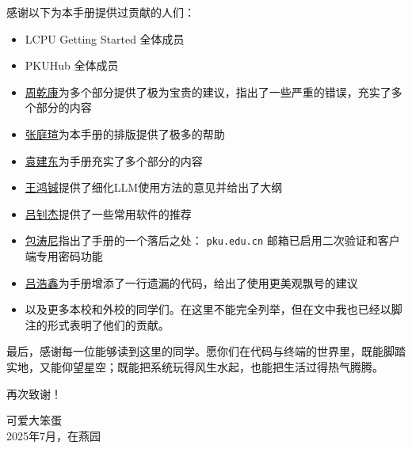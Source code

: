 感谢以下为本手册提供过贡献的人们：
\begin{itemize}
  \item LCPU Getting Started 全体成员
  \item PKUHub 全体成员
  \item \faGithub\href{https://github.com/wszqkzqk}{周乾康}为多个部分提供了极为宝贵的建议，指出了一些严重的错误，充实了多个部分的内容
  \item \faGithub\href{https://github.com/AlphaZTX}{张庭瑄}为本手册的排版提供了极多的帮助
  \item \faGithub\href{https://github.com/yjdyamv}{袁建东}为手册充实了多个部分的内容
  \item \faGithub\href{https://github.com/whcpumpkin}{王鸿铖}提供了细化LLM使用方法的意见并给出了大纲
  \item \faGithub\href{https://github.com/Elkeid-me}{吕钊杰}提供了一些常用软件的推荐
  \item \faGithub\href{https://github.com/AsTonyshment}{包涛尼}指出了手册的一个落后之处： \texttt{pku.edu.cn} 邮箱已启用二次验证和客户端专用密码功能
  \item \faGithub\href{https://github.com/ha0xin}{吕浩鑫}为手册增添了一行遗漏的代码，给出了使用更美观飘号的建议
  \item 以及更多本校和外校的同学们。在这里不能完全列举，但在文中我也已经以脚注的形式表明了他们的贡献。
\end{itemize}


最后，感谢每一位能够读到这里的同学。愿你们在代码与终端的世界里，既能脚踏实地，又能仰望星空；既能把系统玩得风生水起，也能把生活过得热气腾腾。

再次致谢！

\vspace{2em}
\begin{flushright}
  可爱大笨蛋 \\
  2025年7月，在燕园
\end{flushright}